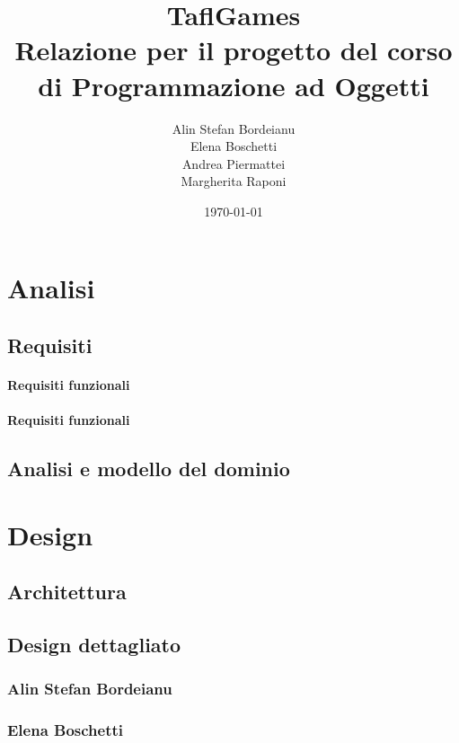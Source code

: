 \documentclass[a4paper,12pt]{report}
\title{TaflGames\\\large Relazione per il progetto del corso\\ di Programmazione ad Oggetti}
\author{Alin Stefan Bordeianu \\ Elena Boschetti \\ Andrea Piermattei \\ Margherita Raponi}
\date{\today}
\begin{document}
\maketitle

\tableofcontents


\chapter{Analisi}


\section{Requisiti}

\subsubsection{Requisiti funzionali}

\subsubsection{Requisiti funzionali}


\section{Analisi e modello del dominio}



\chapter{Design}


\section{Architettura}


\section{Design dettagliato}

\subsection{Alin Stefan Bordeianu}

\subsection{Elena Boschetti}
\end{document}

